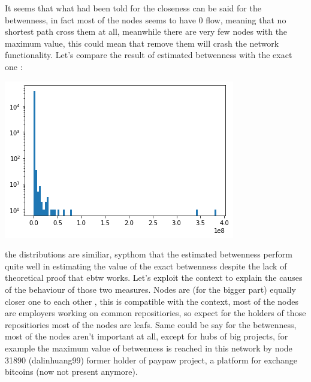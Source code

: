 \documentclass[]{article}
\begin{document}
    It seems that what had been told for the closeness can be said for the betwenness, in fact most of the nodes seems to have 0 flow, meaning that no shortest path cross them at all, meanwhile there are very few nodes with the maximum value, this could mean that remove them will crash the network functionality. Let's compare the result of estimated betwenness with the exact one :
    \begin{center}
        \includegraphics[scale=0.5]{charts/btw_dist.png}
    \end{center}
    the distributions are similiar, sypthom that the estimated betwenness perform quite well in estimating the value of the exact betwenness despite the lack of theoretical proof that ebtw works. Let's exploit the context to explain the causes of the behaviour of those two measures. Nodes are (for the bigger part) equally closer one to each other , this is compatible with the context, most of the nodes are employers working on common repositiories, so expect for the holders of those repositiories most of the nodes are leafs. Same could be say for the betwenness, most of the nodes aren't important at all, except for hubs of big projects, for example the maximum value of betwenness is reached in this network by node 31890 (dalinhuang99) former holder of paypaw project, a platform for exchange bitcoins (now not present anymore).
\end{document}
